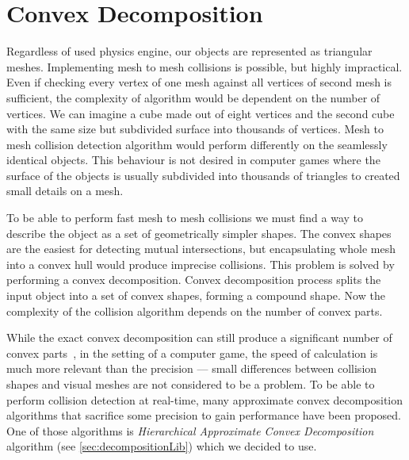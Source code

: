 \section{Convex Decomposition}
\label{sec:decomposition}
Regardless of used physics engine, our objects are represented as triangular meshes. Implementing mesh to mesh collisions is possible, but highly impractical. Even if checking every vertex of one mesh against all vertices of second mesh is sufficient, the complexity of algorithm would be dependent on the number of vertices. We can imagine a cube made out of eight vertices and the second cube with the same size but subdivided surface into thousands of vertices. Mesh to mesh collision detection algorithm would perform differently on the seamlessly identical objects. This behaviour is not desired in computer games where the surface of the objects is usually subdivided into thousands of triangles to created small details on a mesh.

To be able to perform fast  mesh to mesh collisions we must find a way to describe the object as a set of geometrically simpler shapes. The convex shapes are the easiest for detecting mutual intersections, but encapsulating whole mesh into a convex hull would produce imprecise collisions. This problem is solved by performing a convex decomposition. Convex decomposition process splits the input object into a set of convex shapes, forming a compound shape. Now the complexity of the collision algorithm depends on the number of convex parts.

While the exact convex decomposition can still produce a significant number of convex parts~\cite{convexDecomp}, in the setting of a computer game, the speed of calculation is much more relevant than the precision --- small differences between collision shapes and visual meshes are not considered to be a problem. To be able to perform collision detection at real-time, many approximate convex decomposition algorithms that sacrifice some precision to gain performance have been proposed. One of those algorithms is \emph{Hierarchical Approximate Convex Decomposition} algorithm (see \cref{sec:decompositionLib}) which we decided to use.


